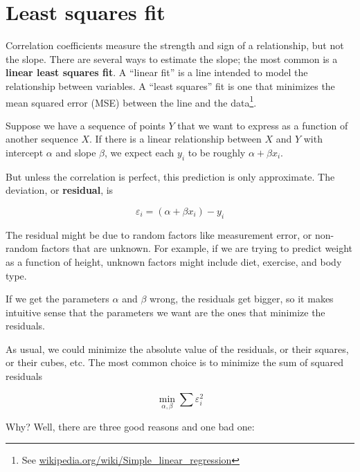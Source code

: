 \documentclass[12pt]{book}
\begin{document}
\section{Least squares fit}

\newcommand{\slope}{\beta}
\newcommand{\inter}{\alpha}

Correlation coefficients measure the strength and sign of a
relationship, but not the slope.  There are several ways to estimate
the slope; the most common is a {\bf linear least squares fit}.  A
``linear fit'' is a line intended to model the relationship between
variables.  A ``least squares'' fit is one that minimizes the mean
squared error (MSE) between the line and the data\footnote{See
  \url{wikipedia.org/wiki/Simple_linear_regression}}.

Suppose we have a sequence of points $Y$ that we want to express as a
function of another sequence $X$.  If there is a linear relationship
between $X$ and $Y$ with intercept $\inter$ and slope $\slope$, we
expect each $y_i$ to be roughly $\inter + \slope x_i$.

But unless the correlation is perfect, this prediction is only
approximate.  The deviation, or {\bf residual}, is 

\newcommand{\eps}{\varepsilon}

\[ \eps_i = (\inter + \slope x_i) - y_i \]

The residual might be due to random factors like measurement error,
or non-random factors that are unknown.  For example, if we are
trying to predict weight as a function of height, unknown factors
might include diet, exercise, and body type.

If we get the parameters $\inter$ and $\slope$ wrong, the residuals
get bigger, so it makes intuitive sense that the parameters we want
are the ones that minimize the residuals.

As usual, we could minimize the absolute value of the
residuals, or their squares, or their cubes, etc.  The most common
choice is to minimize the sum of squared residuals

\[ \min_{\inter, \slope} \sum \eps_i^2 \]

Why?  Well, there are three good reasons and one bad one:
\end{document}
